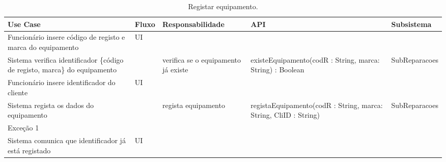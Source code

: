 \documentclass[../relatorio.tex]{subfiles}
\begin{document}
\begin{landscape}
    \begin{table}[!h]
        \centering
        \begin{tabular}{|p{5cm}|p{1cm}|p{4cm}|p{6cm}|p{3cm}|}
            \hline
            \rowcolor{gray!20!white}
            Use Case & Fluxo                                            & Responsabilidade & API & Subsistema \\
            \hline
            \rowcolor{yellow}
            Funcionário insere código de registo e marca do equipamento
                     & UI
                     & 
                     & 
                     & 
            \\
            \hline
            Sistema verifica identificador \{código de registo, marca\} do equipamento
                     & 
                     & verifica se o equipamento já existe
                     & existeEquipamento(codR : String, marca: String) : Boolean
                     & SubReparacoes
            \\
            \hline
            \rowcolor{yellow}
            Funcionário insere identificador do cliente
                     & UI
                     & 
                     & 
                     & 
            \\
            \hline
            Sistema regista os dados do equipamento
                     & 
                     & regista equipamento
                     & registaEquipamento(codR : String, marca: String, CliID : String)
                     & SubReparacoes
            \\
            \hline
            \rowcolor{red!30}
            Exceção 1  &                                                  &                  &     &            \\
            \hline
            Sistema comunica que identificador já está registado
                     & UI
                     & 
                     & 
                     & 
            \\
            \hline
        \end{tabular}
        \caption{Registar equipamento.}
    \end{table}
\end{landscape}
\end{document}
